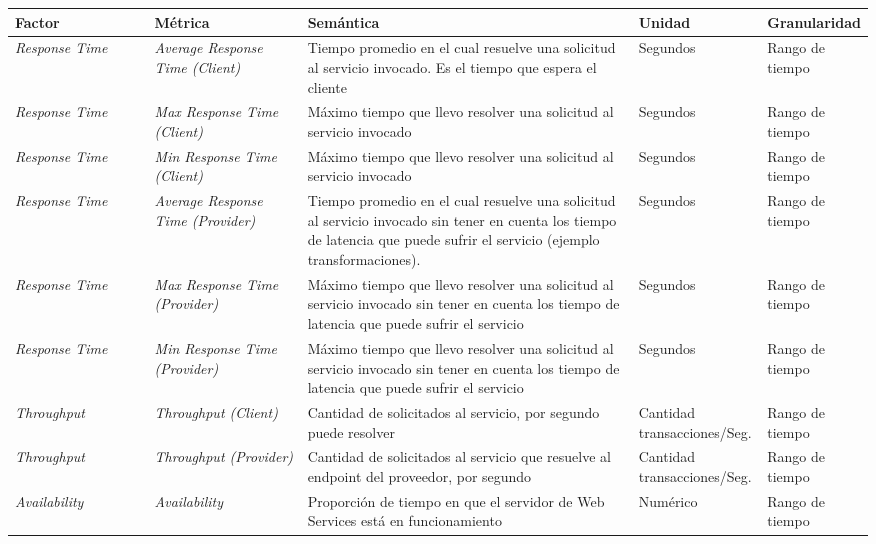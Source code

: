 \begin{table}[h]
  \centering
    \begin{tabular}{ |p{0.18\linewidth} | p{0.20\linewidth} | p{0.45\linewidth} | p{0.15\linewidth} | p{0.20\linewidth}|} 
    \hline
     \textbf{Factor} & \textbf{Métrica} & \textbf{Semántica}  & \textbf{Unidad}  & \textbf{Granularidad}  \\
      \hline
       \hline
       \emph{Response Time} & \emph{ Average Response Time (Client)} &Tiempo promedio en el cual resuelve una solicitud al servicio invocado. Es el tiempo que espera el cliente & Segundos & Rango de tiempo\\
      \hline
       \emph{ Response Time}&  \emph{Max Response Time (Client) }& Máximo tiempo que llevo resolver una solicitud al servicio invocado  & Segundos & Rango de tiempo\\
      \hline
       \emph{Response Time} &  \emph{Min Response Time (Client)}  & Máximo tiempo que llevo resolver una solicitud al servicio invocado & Segundos & Rango de tiempo\\
      \hline
       \emph{Response Time} &  \emph{Average Response Time (Provider)} &Tiempo promedio en el cual resuelve una solicitud al servicio invocado sin tener en cuenta los tiempo de latencia que puede sufrir el servicio (ejemplo transformaciones). & Segundos & Rango de tiempo\\
      \hline
      \emph{ Response Time}&  \emph{ Max Response Time (Provider)}  & Máximo tiempo que llevo resolver una solicitud al servicio invocado sin tener en cuenta los tiempo de latencia que puede sufrir el servicio  & Segundos & Rango de tiempo\\
      \hline
       \emph{Response Time} &  \emph{Min Response Time (Provider)}  & Máximo tiempo que llevo resolver una solicitud al servicio invocado sin tener en cuenta los tiempo de latencia que puede sufrir el servicio & Segundos & Rango de tiempo\\
      \hline
        \emph{Throughput} &  \emph{Throughput (Client)}  & Cantidad de solicitados al servicio, por segundo puede resolver & Cantidad transacciones/Seg. & Rango de tiempo\\
      \hline
       \emph{Throughput} &  \emph{Throughput (Provider)}  & Cantidad de solicitados al servicio que resuelve al endpoint del proveedor, por segundo & Cantidad transacciones/Seg. & Rango de tiempo\\
      \hline
        \emph{Availability} &  \emph{Availability}  & Proporción de tiempo en que el servidor de Web Services está en funcionamiento & Numérico & Rango de tiempo\\

\end{tabular}
\end{table}
